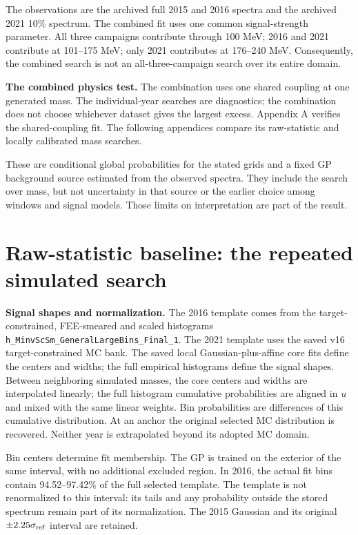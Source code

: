\documentclass[11pt]{article}
\begin{document}
The observations are the archived full 2015 and 2016 spectra and the archived 2021 10\% spectrum. The combined fit uses one common signal-strength parameter. All three campaigns contribute through 100 MeV; 2016 and 2021 contribute at 101--175 MeV; only 2021 contributes at 176--240 MeV. Consequently, the combined search is not an all-three-campaign search over its entire domain.

\textbf{The combined physics test.} The combination uses one shared coupling at one generated mass. The individual-year searches are diagnostics; the combination does not choose whichever dataset gives the largest excess. Appendix A verifies the shared-coupling fit. The following appendices compare its raw-statistic and locally calibrated mass searches.

These are conditional global probabilities for the stated grids and a fixed GP background source estimated from the observed spectra. They include the search over mass, but not uncertainty in that source or the earlier choice among windows and signal models. Those limits on interpretation are part of the result.

\clearpage\section*{Raw-statistic baseline: the repeated simulated search}

\textbf{Signal shapes and normalization.} The 2016 template comes from the target-constrained, FEE-smeared and scaled histograms \texttt{h\_MinvScSm\_GeneralLargeBins\_Final\_1}. The 2021 template uses the saved v16 target-constrained MC bank. The saved local Gaussian-plus-affine core fits define the centers and widths; the full empirical histograms define the signal shapes. Between neighboring simulated masses, the core centers and widths are interpolated linearly; the full histogram cumulative probabilities are aligned in $u$ and mixed with the same linear weights. Bin probabilities are differences of this cumulative distribution. At an anchor the original selected MC distribution is recovered. Neither year is extrapolated beyond its adopted MC domain.

Bin centers determine fit membership. The GP is trained on the exterior of the same interval, with no additional excluded region. In 2016, the actual fit bins contain 94.52--97.42\% of the full selected template. The template is not renormalized to this interval: its tails and any probability outside the stored spectrum remain part of its normalization. The 2015 Gaussian and its original $\pm2.25\sigma_{\rm ref}$ interval are retained.
\end{document}
